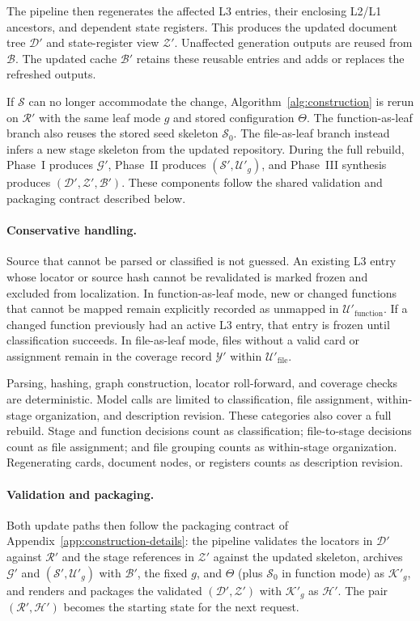 \documentclass[]{ailab}
\newcommand{\hbsmall}{\textsf{function-as-leaf}}
\newcommand{\hblarge}{\textsf{file-as-leaf}}
\begin{document}
The pipeline then regenerates the affected L3 entries, their enclosing L2/L1
ancestors, and dependent state registers. This produces the updated document
tree $\mathcal{D}'$ and state-register view $\mathcal{Z}'$. Unaffected generation
outputs are reused from $\mathcal{B}$. The updated cache $\mathcal{B}'$ retains
these reusable entries and adds or replaces the refreshed outputs.

If $\mathcal{S}$ can no longer accommodate the change,
Algorithm~\ref{alg:construction} is rerun on $\mathcal{R}'$ with the same leaf
mode $g$ and stored configuration $\Theta$. The \hbsmall{} branch also reuses the
stored seed skeleton $\mathcal{S}_0$. The \hblarge{} branch instead infers a new
stage skeleton from the updated repository. During the full rebuild, Phase~I
produces $\mathcal{G}'$, Phase~II produces
$(\mathcal{S}',\mathcal{U}'_g)$, and Phase~III synthesis produces
$(\mathcal{D}',\mathcal{Z}',\mathcal{B}')$. These components follow the shared
validation and packaging contract described below.

\paragraph{Conservative handling.}
Source that cannot be parsed or classified is not guessed. An existing L3 entry
whose locator or source hash cannot be revalidated is marked frozen and excluded
from localization. In \hbsmall{} mode, new or changed functions that cannot be
mapped remain explicitly recorded as unmapped in
$\mathcal{U}'_{\mathrm{function}}$. If a changed function previously had an
active L3 entry, that entry is frozen until classification succeeds. In
\hblarge{} mode, files without a valid card or assignment remain in the coverage
record $\mathcal{Y}'$ within $\mathcal{U}'_{\mathrm{file}}$.

Parsing, hashing, graph construction, locator roll-forward, and coverage checks
are deterministic. Model calls are limited to classification, file assignment,
within-stage organization, and description revision. These categories also
cover a full rebuild. Stage and function decisions count as classification;
file-to-stage decisions count as file assignment; and file grouping counts as
within-stage organization. Regenerating cards, document nodes, or registers
counts as description revision.

\paragraph{Validation and packaging.}
Both update paths then follow the packaging contract of
Appendix~\ref{app:construction-details}: the pipeline validates the locators in
$\mathcal{D}'$ against $\mathcal{R}'$ and the stage references in $\mathcal{Z}'$
against the updated skeleton, archives $\mathcal{G}'$ and
$(\mathcal{S}',\mathcal{U}'_g)$ with $\mathcal{B}'$, the fixed $g$, and $\Theta$
(plus $\mathcal{S}_0$ in function mode) as $\mathcal{K}'_g$, and renders and
packages the validated $(\mathcal{D}',\mathcal{Z}')$ with $\mathcal{K}'_g$ as
$\mathcal{H}'$. The pair $(\mathcal{R}',\mathcal{H}')$ becomes the starting state
for the next request.
\end{document}

